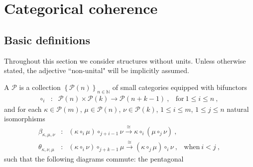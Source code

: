
\section{Categorical coherence} 
\label{s:catoperads}
 
\subsection{Basic definitions}

Throughout this section we consider structures without units.
Unless otherwise stated, the adjective ``non-unital" will be implicitly assumed. 

\begin{definition} 
\label{def:catoperad}
A  $\mathcal{P}$ is a collection $\left\{  \mathcal{P}(n)  \right\}_{n\in \mathbb{N}}$ of small categories equipped with bifunctors  
$$ \begin{array}{clll}
\circ_i&\colon& \mathcal{P}(n) \times
                    \mathcal{P}(k)
                    \longrightarrow \mathcal{P}(n+k-1) \ ,
                    & \text{for}\ 1 \leq i \leq n \ ,
\end{array}  $$
and for each $\kappa \in \mathcal{P}(m)$,  $\mu \in \mathcal{P}(n)$, $\nu \in \mathcal{P}(k)$, $1 \leq i \leq m$, $1 \leq j \leq n$ natural isomorphisms 
$$ \begin{array}{clll}
    \beta_{\kappa,\mu,\nu}&\colon& 
    (\kappa \circ_i \mu) \circ_{j+i-1} \nu  \overset{\cong}{\longrightarrow} \kappa \circ_i (\mu \circ_j \nu) \ , &  \\
    \theta_{\kappa,\nu,\mu}&\colon& 
    (\kappa \circ_i \nu) \circ_{j+k-1} \mu 
    \overset{\cong}{\longrightarrow} (\kappa \circ_j \mu) \circ_i \nu \ , & \text{when}\ i < j \ , 
\end{array}  $$
such that the following diagrams commute: the pentagonal \\
\begin{center}
\end{center}
\end{definition}
